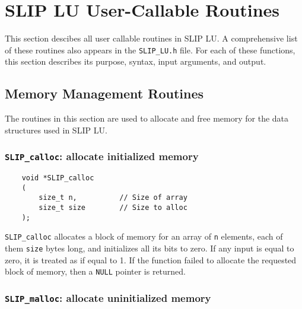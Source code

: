 \documentclass[12pt]{article}
\theoremstyle{definition}
\begin{document}
\cprotect\section{SLIP LU User-Callable Routines}
\label{s:UserRoutines}

This section descibes all user callable routines in SLIP LU. A comprehensive
list of these routines also appears in the \verb|SLIP_LU.h| file. For each of
these functions, this section describes its purpose, syntax, input arguments,
and output.

\subsection{Memory Management Routines} \label{s:user:memmanag}

The routines in this section are used to allocate and free memory for the data
structures used in SLIP LU.

\cprotect\subsubsection{\verb|SLIP_calloc|: allocate initialized memory}
\label{ss:SLIP_calloc}

\begin{mdframed}[userdefinedwidth=6in]
{\footnotesize
\begin{verbatim}
    void *SLIP_calloc
    (
        size_t n,          // Size of array
        size_t size        // Size to alloc
    );
\end{verbatim}
} \end{mdframed}

\verb|SLIP_calloc| allocates a block of memory for an array of \verb|n|
elements, each of them \verb|size| bytes long, and initializes all its bits to
zero.  If any input is equal to zero, it is treated as if equal to 1.  If the
function failed to allocate the requested block of memory, then a \verb|NULL|
pointer is returned.

\cprotect\subsubsection{\verb|SLIP_malloc|: allocate uninitialized memory}
\label{ss:SLIP_malloc}
\end{document}
